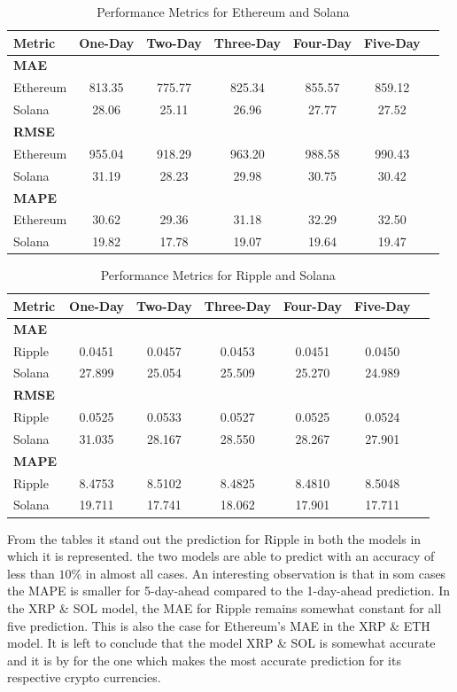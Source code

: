 \begin{table}[H]
\centering
\caption{Performance Metrics for Ethereum and Solana}
\begin{tabular}{lcccccc}
\toprule
\textbf{Metric} & \textbf{One-Day} & \textbf{Two-Day} & \textbf{Three-Day} & \textbf{Four-Day} & \textbf{Five-Day} \\
\midrule
\textbf{MAE} & & & & & \\
Ethereum      & 813.35 & 775.77 & 825.34 & 855.57 & 859.12 \\
Solana        & 28.06  & 25.11  & 26.96  & 27.77  & 27.52  \\
\midrule
\textbf{RMSE} & & & & & \\
Ethereum      & 955.04 & 918.29 & 963.20 & 988.58 & 990.43 \\
Solana        & 31.19  & 28.23  & 29.98  & 30.75  & 30.42  \\
\midrule
\textbf{MAPE} & & & & & \\
Ethereum      & 30.62  & 29.36  & 31.18  & 32.29  & 32.50  \\
Solana        & 19.82  & 17.78  & 19.07  & 19.64  & 19.47  \\
\bottomrule
\end{tabular}
\end{table}

\begin{table}[H]
\centering
\caption{Performance Metrics for Ripple and Solana}
\begin{tabular}{lcccccc}
\toprule
\textbf{Metric} & \textbf{One-Day} & \textbf{Two-Day} & \textbf{Three-Day} & \textbf{Four-Day} & \textbf{Five-Day} \\
\midrule
\textbf{MAE} & & & & & \\
Ripple        & 0.0451 & 0.0457 & 0.0453 & 0.0451 & 0.0450 \\
Solana        & 27.899 & 25.054 & 25.509 & 25.270 & 24.989 \\
\midrule
\textbf{RMSE} & & & & & \\
Ripple        & 0.0525 & 0.0533 & 0.0527 & 0.0525 & 0.0524 \\
Solana        & 31.035 & 28.167 & 28.550 & 28.267 & 27.901 \\
\midrule
\textbf{MAPE} & & & & & \\
Ripple        & 8.4753 & 8.5102 & 8.4825 & 8.4810 & 8.5048 \\
Solana        & 19.711 & 17.741 & 18.062 & 17.901 & 17.711 \\
\bottomrule
\end{tabular}
\end{table}
\noindent From the tables it stand out the prediction for Ripple in both the models in which it is represented. the two models are able to predict with an accuracy of less than $10\%$ in almost all cases. An interesting observation is that in som cases the MAPE is smaller for 5-day-ahead compared to the 1-day-ahead prediction. In the XRP \& SOL model, the MAE for Ripple remains somewhat constant for all five prediction. This is also the case for Ethereum's MAE in the XRP \& ETH model. It is left to conclude that the model XRP \& SOL is somewhat accurate and it is by for the one which makes the most accurate prediction for its respective crypto currencies.
\pause

